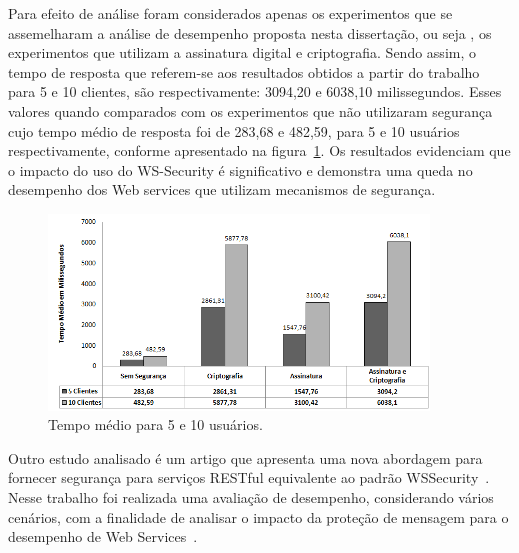 Para efeito de análise foram considerados apenas os experimentos que se assemelharam a análise de desempenho proposta nesta dissertação, ou seja , os experimentos que utilizam a assinatura digital e criptografia.  Sendo assim, o tempo de resposta  que referem-se aos resultados obtidos a partir do trabalho~\cite{rodrigues2011analysis} para  5 e 10 clientes, são respectivamente: 3094,20 e 6038,10 milissegundos. Esses valores quando comparados com os experimentos que não utilizaram segurança cujo tempo médio de resposta foi de 283,68 e  482,59,  para 5 e 10 usuários respectivamente, conforme apresentado na figura~\ref{fig:comparativowssecurity}. Os resultados  evidenciam que o impacto do uso do WS-Security é significativo e demonstra uma queda no desempenho dos Web services que utilizam mecanismos de segurança.


\begin{figure}[!htb]
    \centering
    \includegraphics[width=0.9\textwidth]{comparativowssecurity.png}
    \caption{Tempo médio para 5 e 10 usuários.}
    \label{fig:comparativowssecurity}
\end{figure}

Outro estudo analisado é um artigo que apresenta uma nova abordagem para fornecer segurança para serviços RESTful equivalente ao padrão WSSecurity~\cite{verstichel}. Nesse trabalho foi realizada uma avaliação de desempenho, considerando vários cenários, com a finalidade de analisar o impacto da proteção de mensagem para o desempenho de Web Services~\cite{verstichel}.

